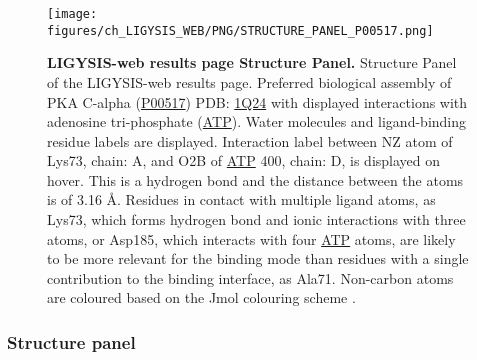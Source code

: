 \begin{figure}[htb!]
    \centering
    \texttt{[image: figures/ch\_LIGYSIS\_WEB/PNG/STRUCTURE\_PANEL\_P00517.png]}
    \caption[LIGYSIS-web results page Structure Panel]{\textbf{LIGYSIS-web results page Structure Panel.} Structure Panel of the LIGYSIS-web results page. Preferred biological assembly of PKA C-alpha (\href{https://www.uniprot.org/uniprotkb/P00517/entry}{P00517}) PDB: \href{https://www.ebi.ac.uk/pdbe/entry/pdb/1Q24}{1Q24} \cite{GAEL_2003_AKT} with displayed interactions with adenosine tri-phosphate (\href{https://www.ebi.ac.uk/pdbe-srv/pdbechem/chemicalCompound/show/ATP}{ATP}). Water molecules and ligand-binding residue labels are displayed. Interaction label between NZ atom of Lys73, chain: A, and O2B of \href{https://www.ebi.ac.uk/pdbe-srv/pdbechem/chemicalCompound/show/ATP}{ATP} 400, chain: D, is displayed on hover. This is a hydrogen bond and the distance between the atoms is of 3.16 \AA{}. Residues in contact with multiple ligand atoms, as Lys73, which forms hydrogen bond and ionic interactions with three atoms, or Asp185, which interacts with four \href{https://www.ebi.ac.uk/pdbe-srv/pdbechem/chemicalCompound/show/ATP}{ATP} atoms, are likely to be more relevant for the binding mode than residues with a single contribution to the binding interface, as Ala71. Non-carbon atoms are coloured based on the Jmol colouring scheme \cite{JMOL}.}
    \label{fig:LIGYSIS_web_STRUCTURE_PANEL}
\end{figure}

\subsubsection{Structure panel}

